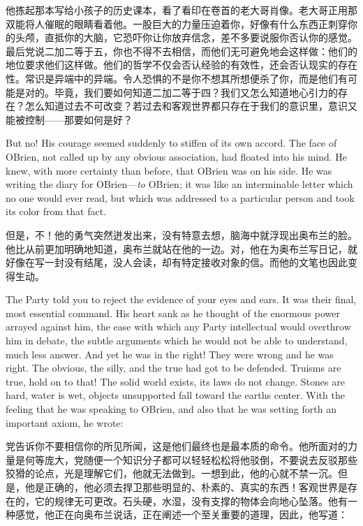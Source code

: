 \begin{paracol}{2}
\switchcolumn

他拣起那本写给小孩子的历史课本，看了看印在卷首的老大哥肖像。老大哥正用那双能将人催眠的眼睛看着他。一股巨大的力量压迫着你，好像有什么东西正刺穿你的头颅，直抵你的大脑，它恐吓你让你放弃信念，差不多要说服你否认你的感觉。最后党说二加二等于五，你也不得不去相信，而他们无可避免地会这样做：他们的地位要求他们这样做。他们的哲学不仅会否认经验的有效性，还会否认现实的存在性。常识是异端中的异端。令人恐惧的不是你不想其所想便杀了你，而是他们有可能是对的。毕竟，我们要如何知道二加二等于四？我们又怎么知道地心引力的存在？怎么知道过去不可改变？若过去和客观世界都只存在于我们的意识里，意识又能被控制——那要如何是好？

\switchcolumn*

But no! His courage seemed suddenly to stiffen of its own accord. The
face of O\textquotesingle Brien, not called up by any obvious
association, had floated into his mind. He knew, with more certainty
than before, that O\textquotesingle Brien was on his side. He was
writing the diary for O\textquotesingle Brien---\emph{to}
O\textquotesingle Brien; it was like an interminable letter which no one
would ever read, but which was addressed to a particular person and took
its color from that fact.

\switchcolumn

但是，不！他的勇气突然迸发出来，没有特意去想，脑海中就浮现出奥布兰的脸。他比从前更加明确地知道，奥布兰就站在他的一边。对，他在为奥布兰写日记，就好像在写一封没有结尾，没人会读，却有特定接收对象的信。而他的文笔也因此变得生动。

\switchcolumn*

The Party told you to reject the evidence of your eyes and ears. It was
their final, most essential command. His heart sank as he thought of the
enormous power arrayed against him, the ease with which any Party
intellectual would overthrow him in debate, the subtle arguments which
he would not be able to understand, much less answer. And yet he was in
the right! They were wrong and he was right. The obvious, the silly, and
the true had got to be defended. Truisms are true, hold on to that! The
solid world exists, its laws do not change. Stones are hard, water is
wet, objects unsupported fall toward the earth\textquotesingle s center.
With the feeling that he was speaking to O\textquotesingle Brien, and
also that he was setting forth an important axiom, he wrote:

\switchcolumn

党告诉你不要相信你的所见所闻，这是他们最终也是最本质的命令。他所面对的力量是何等庞大，党随便一个知识分子都可以轻轻松松将他驳倒，不要说去反驳那些狡猾的论点，光是理解它们，他就无法做到。一想到此，他的心就不禁一沉。但是，他是正确的，他必须去捍卫那些明显的、朴素的、真实的东西！客观世界是存在的，它的规律无可更改。石头硬，水湿，没有支撑的物体会向地心坠落。他有一种感觉，他正在向奥布兰说话，正在阐述一个至关重要的道理，因此，他写道：


\end{paracol}
